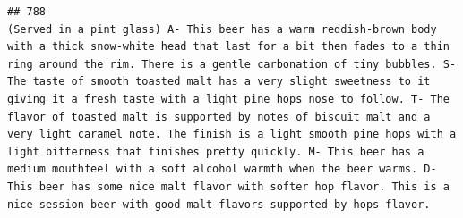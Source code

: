\documentclass[
  a4paper,
]{article}
\begin{document}
\begin{verbatim}
## 788                                                                                                                                                                                                                                                                                                                                                                                                                                                                                                                                                                                                                                                                                                                                                                                                                                                                                                                                                                                         (Served in a pint glass) A- This beer has a warm reddish-brown body with a thick snow-white head that last for a bit then fades to a thin ring around the rim. There is a gentle carbonation of tiny bubbles. S- The taste of smooth toasted malt has a very slight sweetness to it giving it a fresh taste with a light pine hops nose to follow. T- The flavor of toasted malt is supported by notes of biscuit malt and a very light caramel note. The finish is a light smooth pine hops with a light bitterness that finishes pretty quickly. M- This beer has a medium mouthfeel with a soft alcohol warmth when the beer warms. D- This beer has some nice malt flavor with softer hop flavor. This is a nice session beer with good malt flavors supported by hops flavor.

\end{verbatim}
\end{document}
